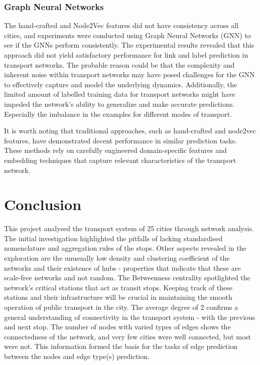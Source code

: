 \documentclass{article}
\theoremstyle{plain}
\theoremstyle{definition}
\theoremstyle{remark}
\begin{document}
\subsubsection{Graph Neural Networks}
The hand-crafted and Node2Vec features did not have consistency across all cities, and experiments were conducted using Graph Neural Networks (GNN) to see if the GNNs perform consistently. The experimental results revealed that this approach did not yield satisfactory performance for link and label prediction in transport networks. The probable reason could be that the complexity and inherent noise within transport networks may have posed challenges for the GNN to effectively capture and model the underlying dynamics. Additionally, the limited amount of labelled training data for transport networks might have impeded the network's ability to generalize and make accurate predictions. Especially the imbalance in the examples for different modes of transport.

It is worth noting that traditional approaches, such as hand-crafted and node2vec features, have demonstrated decent performance in similar prediction tasks. These methods rely on carefully engineered domain-specific features and embedding techniques that capture relevant characteristics of the transport network.

\section{Conclusion}
\label{conclusion}

This project analysed the transport system of 25 cities through network analysis. The initial investigation highlighted the pitfalls of lacking standardised nomenclature and aggregation rules of the stops. Other aspects revealed in the exploration are the unusually low density and clustering coefficient of the networks and their existence of hubs - properties that indicate that these are scale-free networks and not random. The Betweenness centrality spotlighted the network's critical stations that act as transit stops. Keeping track of these stations and their infrastructure will be crucial in maintaining the smooth operation of public transport in the city. The average degree of 2 confirms a general understanding of connectivity in the transport system - with the previous and next stop. The number of nodes with varied types of edges shows the connectedness of the network, and very few cities were well connected, but most were not. This information formed the basis for the tasks of edge prediction between the nodes and edge type(s) prediction.
\end{document}
